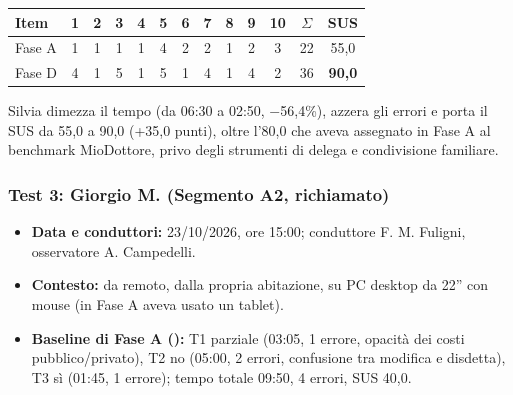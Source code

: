 \begin{center}
\label{tab:d-sus-silvia}
\footnotesize
\setlength{\tabcolsep}{3.5pt}
\begin{tabular}{@{}l *{10}{c} c c@{}}
\toprule
\textbf{Item} & \textbf{1} & \textbf{2} & \textbf{3} & \textbf{4} & \textbf{5} & \textbf{6} & \textbf{7} & \textbf{8} & \textbf{9} & \textbf{10} & $\Sigma$ & \textbf{SUS} \\
\midrule
Fase A & 1 & 1 & 1 & 1 & 4 & 2 & 2 & 1 & 2 & 3 & 22 & 55,0 \\
Fase D & 4 & 1 & 5 & 1 & 5 & 1 & 4 & 1 & 4 & 2 & 36 & \textbf{90,0} \\
\bottomrule
\end{tabular}
\end{center}

Silvia dimezza il tempo (da 06:30 a 02:50, $-$56,4\%), azzera gli errori e porta il SUS da 55,0 a 90,0 (+35,0 punti), oltre l'80,0 che aveva assegnato in Fase A al benchmark MioDottore, privo degli strumenti di delega e condivisione familiare.

\subsubsection{Test 3: Giorgio M. (Segmento A2, richiamato)}

\begin{itemize}
\item \textbf{Data e conduttori:} 23/10/2026, ore 15:00; conduttore F. M. Fuligni, osservatore A. Campedelli.
\item \textbf{Contesto:} da remoto, dalla propria abitazione, su PC desktop da 22'' con mouse (in Fase A aveva usato un tablet).
\item \textbf{Baseline di Fase A ():} T1 parziale (03:05, 1 errore, opacità dei costi pubblico/privato), T2 no (05:00, 2 errori, confusione tra modifica e disdetta), T3 sì (01:45, 1 errore); tempo totale 09:50, 4 errori, SUS 40,0.
\end{itemize}


